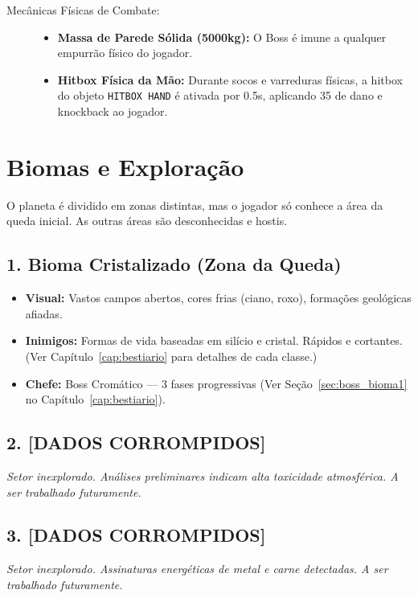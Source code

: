 \documentclass[a4paper,12pt]{report}
\begin{document}
\begin{description}
    \item[Mecânicas Físicas de Combate:]
    \begin{itemize}
        \item \textbf{Massa de Parede Sólida (5000kg):} O Boss é imune a qualquer empurrão físico do jogador.
        \item \textbf{Hitbox Física da Mão:} Durante socos e varreduras físicas, a hitbox do objeto \texttt{HITBOX HAND} é ativada por 0.5s, aplicando 35 de dano e knockback ao jogador.
    \end{itemize}
\end{description}

\chapter{Biomas e Exploração}

O planeta é dividido em zonas distintas, mas o jogador só conhece a área da queda inicial. As outras áreas são desconhecidas e hostis.

\section{1. Bioma Cristalizado (Zona da Queda)}
\begin{itemize}
    \item \textbf{Visual:} Vastos campos abertos, cores frias (ciano, roxo), formações geológicas afiadas.
    \item \textbf{Inimigos:} Formas de vida baseadas em silício e cristal. Rápidos e cortantes. (Ver Capítulo~\ref{cap:bestiario} para detalhes de cada classe.)
    \item \textbf{Chefe:} Boss Cromático --- 3 fases progressivas (Ver Seção~\ref{sec:boss_bioma1} no Capítulo~\ref{cap:bestiario}).
\end{itemize}

\section{2. [DADOS CORROMPIDOS]}
\textit{Setor inexplorado. Análises preliminares indicam alta toxicidade atmosférica. A ser trabalhado futuramente.}

\section{3. [DADOS CORROMPIDOS]}
\textit{Setor inexplorado. Assinaturas energéticas de metal e carne detectadas. A ser trabalhado futuramente.}
\end{document}
